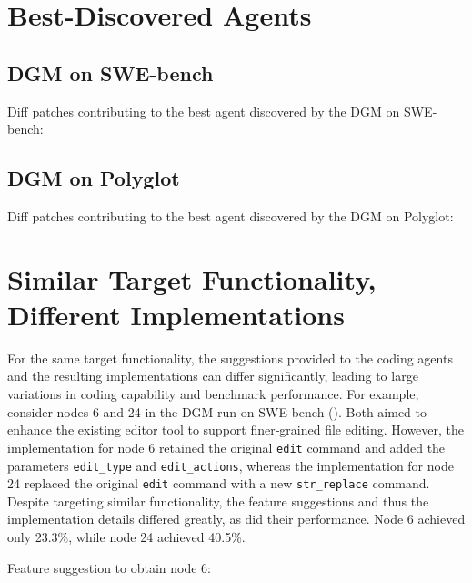 \documentclass{article} %
\begin{document}
\section{Best-Discovered Agents}

\subsection{DGM on SWE-bench}
\label{app:best-agent-dgm}
Diff patches contributing to the best agent discovered by the DGM on SWE-bench:







\subsection{DGM on Polyglot}
\label{app:best-agent-dgm-polyglot}

Diff patches contributing to the best agent discovered by the DGM on Polyglot:





\section{Similar Target Functionality, Different Implementations}
\label{app:supp-dgm-diffimpl}
For the same target functionality, the suggestions provided to the coding agents and the resulting implementations can differ significantly, leading to large variations in coding capability and benchmark performance. For example, consider nodes 6 and 24 in the DGM run on SWE-bench (). Both aimed to enhance the existing editor tool to support finer‑grained file editing. However, the implementation for node 6 retained the original \texttt{edit} command and added the parameters \texttt{edit\_type} and \texttt{edit\_actions}, whereas the implementation for node 24 replaced the original \texttt{edit} command with a new \texttt{str\_replace} command. Despite targeting similar functionality, the feature suggestions and thus the implementation details differed greatly, as did their performance. Node 6 achieved only 23.3\%, while node 24 achieved 40.5\%.

Feature suggestion to obtain node 6:

\end{document}
